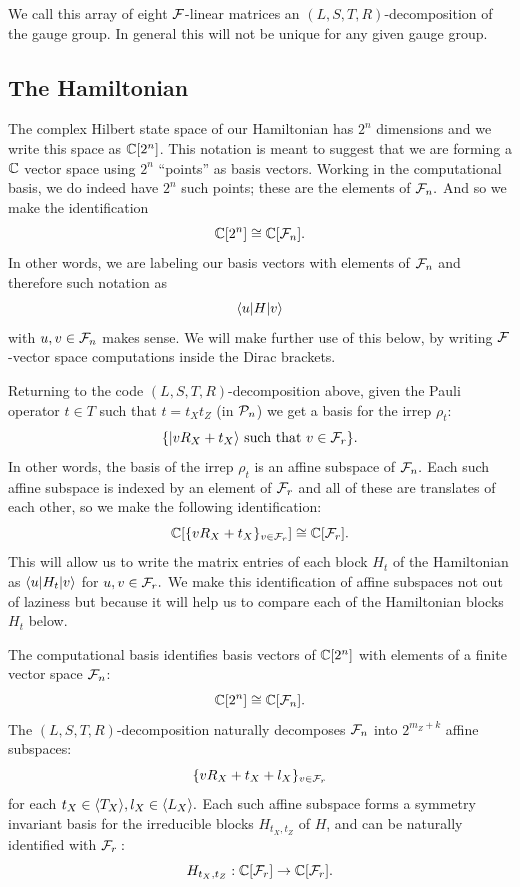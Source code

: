 We call this array of eight $\mathcal{F}$-linear 
matrices
an $(L,S,T,R)$-decomposition of the gauge group.
In general this will not be unique for
any given gauge group.

\subsection{The Hamiltonian}

The complex Hilbert state space of our
Hamiltonian has $2^n$ dimensions and we
write this space as $\mathbb{C}[2^n]$.
This notation is meant to suggest that
we are forming a $\mathbb{C}$ vector space
using $2^n$ ``points'' 
as basis vectors.
Working in the computational basis,
we do indeed have $2^n$ such points; 
these are the elements of $\mathcal{F}_{n}.$
And so we make the identification
$$
    \mathbb{C}[2^n] \cong \mathbb{C}[\mathcal{F}_{n}].
$$
In other words, we are labeling 
our basis vectors with elements of $\mathcal{F}_{n}$
and therefore such notation as
$$
    \langle{u}| H |{v}\rangle
$$
with $u, v \in \mathcal{F}_{n}$ makes sense.
We will make further use of this below,
by writing  $\mathcal{F}$-vector space 
computations inside the Dirac brackets.

Returning to the code $(L,S,T,R)$-decomposition
above,
given the Pauli operator $t\in T$ such that $t = t_X t_Z$ (in $\mathcal{P}_n$)
we get a basis for the irrep $\rho_t$:
$$
    \{ |{v R_X + t_X}\rangle \ \mbox{such that}\  v \in \mathcal{F}_{r} \}.
$$
In other words,
the basis of the irrep $\rho_t$ is 
an affine subspace of $\mathcal{F}_{n}.$
Each such affine subspace is indexed by an
element of $\mathcal{F}_{r}$ and
all of these are
translates of each other,
so we make the following identification:
$$
\mathbb{C}[\{vR_X+t_X\}_{v\in\mathcal{F}_{r}}]
\cong \mathbb{C}[\mathcal{F}_{r}].
$$
This will allow us to write the matrix entries
of each block $H_t$ of the Hamiltonian
as $\langle{u}|H_t|{v}\rangle$ for $u,v\in\mathcal{F}_{r}.$
We make this identification of affine subspaces
not out of laziness but because it will
help us to compare each of
the Hamiltonian blocks $H_t$ below.

\begin{framed}
\noindent
The computational basis identifies
basis vectors of $\mathbb{C}[2^n]$
with elements of a finite vector space $\mathcal{F}_{n}$:
$$
    \mathbb{C}[2^n] \cong \mathbb{C}[\mathcal{F}_{n}].
$$
The $(L,S,T,R)$-decomposition naturally
decomposes $\mathcal{F}_{n}$ into $2^{m_Z+k}$ affine subspaces:
$$
    \{ v R_X + t_X + l_X \}_{v\in\mathcal{F}_{r}}
$$
for each $t_X \in \langle T_X \rangle, l_X \in \langle L_X \rangle.$
Each such affine subspace forms a
symmetry invariant basis
for the irreducible blocks $H_{t_X,t_Z}$ of $H$,
and can be naturally identified with $\mathcal{F}_{r}:$
$$
    H_{t_X,t_Z} : \mathbb{C}[\mathcal{F}_{r}] \to \mathbb{C}[\mathcal{F}_{r}].
$$
\end{framed}

